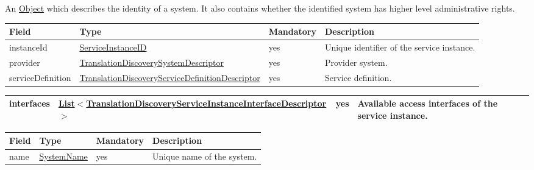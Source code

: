 \documentclass[a4paper]{arrowhead}
\newcommand{\pref}[1]{{\textcolor{ArrowheadGrey}{\hyperref[sec:model:primitives:#1]{#1}}}}
\begin{document}

An \pref{Object} which describes the identity of a system. It also contains whether the identified system has higher level administrative rights.


\begin{table}[ht!]
\begin{tabularx}{\textwidth}{| p{3.9cm} | p{6.2cm} | p{2cm} | X |} \hline
\rowcolor{gray!33} Field & Type & Mandatory & Description \\ \hline
instanceId & \pref{ServiceInstanceID} & yes & Unique identifier of the service instance. \\ \hline
provider & \hyperref[sec:model:TranslationDiscoverySystemDescriptor]{Translation\-Discovery\-System\-Descriptor} & yes & Provider system. \\ \hline
serviceDefinition & \hyperref[sec:model:TranslationDiscoveryServiceDefinitionDescriptor]{Translation\-Discovery\-Service\-Definition\-Descriptor} & yes & Service definition. \\ \hline
\end{tabularx}
\end{table}
\begin{table}[ht!]
\begin{tabularx}{\textwidth}{| p{3.9cm} | p{6.2cm} | p{2cm} | X |} \hline
interfaces & \pref{List}$<$\hyperref[sec:model:TranslationDiscoveryServiceInstanceInterfaceDescriptor]{Translation\-Discovery\-Service\-Instance\-Interface\-Descriptor}$>$ & yes & Available access interfaces of the service instance. \\ \hline
\end{tabularx}
\end{table}


\begin{table}[ht!]
\begin{tabularx}{\textwidth}{| p{3.9cm} | p{4cm} | p{2cm} | X |} \hline
\rowcolor{gray!33} Field & Type & Mandatory & Description \\ \hline
name & \pref{SystemName} & yes & Unique name of the system. \\ \hline
\end{tabularx}
\end{table}

\end{document}
